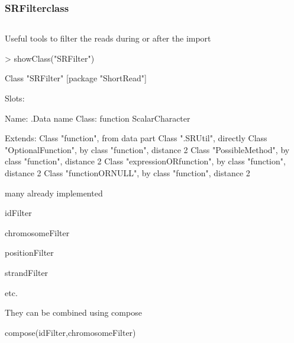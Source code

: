 \documentclass{beamer}
\begin{document}
\begin{frame} [fragile]
\frametitle{SRFilterclass}
\begin{column}{1\textwidth}
  \bit
      \item \small{Useful tools to filter the reads during or after the import}
      \begin{uncoverenv}
\begin{Schunk}
\begin{Sinput}
> showClass("SRFilter")
\end{Sinput}
\begin{Soutput}
Class "SRFilter" [package "ShortRead"]

Slots:
                                      
Name:            .Data            name
Class:        function ScalarCharacter

Extends: 
Class "function", from data part
Class ".SRUtil", directly
Class "OptionalFunction", by class "function", distance 2
Class "PossibleMethod", by class "function", distance 2
Class "expressionORfunction", by class "function", distance 2
Class "functionORNULL", by class "function", distance 2
\end{Soutput}
\end{Schunk}
       \end{uncoverenv}  
       \item \small{many already implemented}
        \bit
            \item \tiny{idFilter}
            \item \tiny{chromosomeFilter}
            \item \tiny{positionFilter}
            \item \tiny{strandFilter}
            \item \tiny{etc.}
        \eit
      \item \small{They can be combined using compose}
        \bit
            \item \small{compose(idFilter,chromosomeFilter)}
        \eit
  \eit
  \end{column}
\end{frame}

\end{document}
